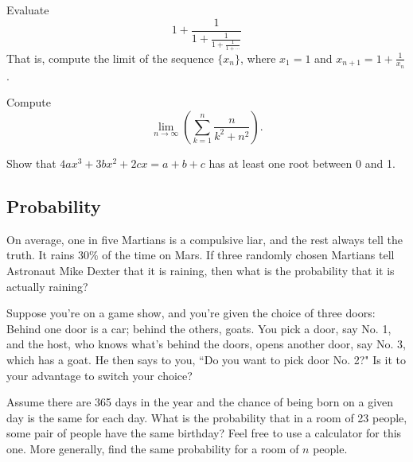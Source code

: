 \documentclass[12pt]{article}
\begin{document}
        \begin{exercise}
            Evaluate
            \[1+\frac{1}{1+\frac{1}{1+\frac{1}{1+\cdots}}}\]
            That is, compute the limit of the sequence $\{x_n\}$, where $x_1 = 1$ and $x_{n+1}=1+\frac{1}{x_n}$.
        \end{exercise}
            
        \begin{exercise}
            Compute
            \[\lim_{n\to\infty}\left(\sum_{k=1}^n \frac{n}{k^2+n^2}\right).\]
        \end{exercise}

        \begin{exercise}
            Show that $4ax^3 + 3bx^2 + 2cx = a + b + c$ has at least one root between 0 and 1.
        \end{exercise}

    \subsection{Probability}

    \begin{exercise}
        On average, one in five Martians is a compulsive liar, and the rest always tell the truth.
        It rains \(30\%\) of the time on Mars.
        If three randomly chosen Martians tell Astronaut Mike Dexter that it is raining, then what is the probability that it is actually raining?
    \end{exercise}

    \begin{exercise}
        Suppose you're on a game show, and you're given the choice of three doors: Behind one door is a car; behind the others, goats. 
        You pick a door, say No. 1, and the host, who knows what's behind the doors, opens another door, say No. 3, which has a goat. 
        He then says to you, ``Do you want to pick door No. 2?" Is it to your advantage to switch your choice?
    \end{exercise}

    \begin{exercise}
        Assume there are 365 days in the year and the chance of being born on a given day is the same for each day.
        What is the probability that in a room of 23 people, some pair of people have the same birthday?
        Feel free to use a calculator for this one.
        More generally, find the same probability for a room of \(n\) people.
    \end{exercise}
\end{document}
